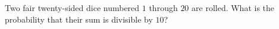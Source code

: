 Two fair twenty-sided dice numbered $1$ through $20$ are rolled. What is the probability that their sum is divisible by $10$?
